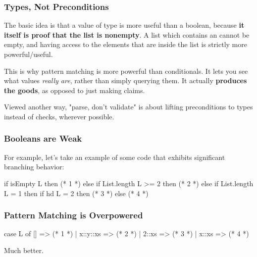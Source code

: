 \documentclass[aspectratio=169]{beamer}
\begin{document}
\begin{frame}[fragile]
  \frametitle{Types, Not Preconditions}

  \tgs

  The basic idea is that a value of type  is more useful than
  a boolean, because \textbf{it itself is proof that the list 
  is nonempty}. A list which contains an  cannot be empty, and having
  access to the elements that are inside the list is strictly more powerful/useful.

  \pause
  \vspace{\fill}

  This is why pattern matching is more powerful than conditionals. It lets you see
  what values \textit{really are}, rather than simply querying them. It actually
  \textbf{produces the goods}, as opposed to just making claims.

  \pause
  \vspace{\fill}

  Viewed another way, "parse, don't validate" is about lifting preconditions to
  types instead of checks, wherever possible.
\end{frame}


\begin{frame}[fragile]
  \frametitle{Booleans are Weak}

  For example, let's take an example of some code that exhibits
  significant branching behavior:

  \pause
  \vspace{\fill}

  \begin{codeblock}
    if isEmpty L then
      (* 1 *) 
    else if List.length L >= 2 then
      (* 2 *)
    else if List.length L = 1 then
      if hd L = 2 then
        (* 3 *) 
      else
        (* 4 *)
  \end{codeblock}

\end{frame}
\begin{frame}[fragile]
  \frametitle{Pattern Matching is Overpowered}

  \begin{codeblock}
    case L of
      [] => (* 1 *)
    | x::y::xs => (* 2 *)
    | 2::xs => (* 3 *)
    | x::xs => (* 4 *)
  \end{codeblock}

  \pause
  \vspace{\fill}

  Much better.
\end{frame}
\end{document}
